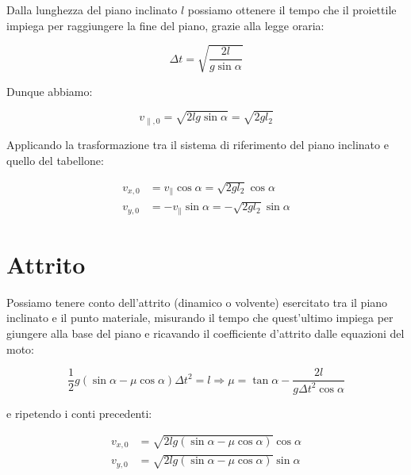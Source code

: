 \documentclass{article}
\begin{document}
Dalla lunghezza del piano inclinato $l$ possiamo ottenere il tempo che il proiettile
impiega per raggiungere la fine del piano, grazie alla legge oraria:

\begin{equation}
\Delta t = \sqrt{\frac{2l}{g\sin{\alpha}}}
\end{equation}

Dunque abbiamo:

\begin{equation}
v_{\parallel,0} = \sqrt{2lg\sin{\alpha}} = \sqrt{2gl_2}
\end{equation}

Applicando la trasformazione tra il sistema di riferimento del piano inclinato
e quello del tabellone:

\begin{align}
v_{x,0} &= v_\parallel\cos\alpha = \sqrt{2gl_2} \cos\alpha \\
v_{y,0} &= -v_\parallel\sin\alpha = -\sqrt{2gl_2} \sin\alpha 
\end{align}

\section{Attrito}
Possiamo tenere conto dell'attrito (dinamico o volvente) esercitato tra il piano inclinato e il punto
materiale, misurando il tempo che quest'ultimo impiega per giungere alla base del piano e ricavando
il coefficiente d'attrito dalle equazioni del moto:

\begin{equation}
\frac{1}{2} g (\sin\alpha - \mu\cos\alpha) \Delta t^2 = l \Rightarrow \mu = \tan\alpha - \frac{2l}{g\Delta t^2 \cos\alpha} 
\end{equation}

e ripetendo i conti precedenti:

\begin{align}
v_{x,0} &= \sqrt{2lg (\sin{\alpha} - \mu \cos\alpha)} \cos\alpha \\
v_{y,0} &= \sqrt{2lg (\sin{\alpha} - \mu \cos\alpha)} \sin\alpha
\end{align}

{}

\end{document}
